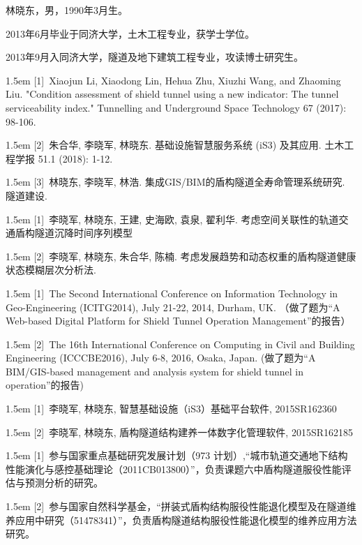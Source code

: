 \begin{resume}

	林晓东，男，1990年3月生。

	2013年6月毕业于同济大学，土木工程专业，获学士学位。

	2013年9月入同济大学，隧道及地下建筑工程专业，攻读博士研究生。


	\hangindent 1.5em
	[1]~Xiaojun Li, Xiaodong Lin, Hehua Zhu, Xiuzhi Wang, and Zhaoming Liu. "Condition assessment of shield tunnel using a new indicator: The tunnel serviceability index." Tunnelling and Underground Space Technology 67 (2017): 98-106.

	\hangindent 1.5em
	[2]~朱合华, 李晓军, 林晓东. 基础设施智慧服务系统 (iS3) 及其应用. 土木工程学报 51.1 (2018): 1-12.

	\hangindent 1.5em
	[3]~林晓东, 李晓军, 林浩. 集成GIS/BIM的盾构隧道全寿命管理系统研究. 隧道建设.


	\hangindent 1.5em
	[1]~李晓军, 林晓东, 王建, 史海欧, 袁泉, 翟利华. 考虑空间关联性的轨道交通盾构隧道沉降时间序列模型

	\hangindent 1.5em
	[2]~李晓军, 林晓东, 朱合华, 陈楠. 考虑发展趋势和动态权重的盾构隧道健康状态模糊层次分析法.


	\hangindent 1.5em
	[1]~The Second  International  Conference  on  Information  Technology  in  Geo-Engineering (ICITG2014), July 21-22, 2014, Durham, UK. （做了题为“A Web-based Digital Platform for Shield Tunnel Operation Management”的报告）

	\hangindent 1.5em
	[2]~The 16th International Conference on Computing in Civil and Building Engineering (ICCCBE2016), July 6-8, 2016, Osaka, Japan. (做了题为“A BIM/GIS-based management and analysis system for shield tunnel in operation”的报告)


	\hangindent 1.5em
	[1]~李晓军, 林晓东, 智慧基础设施（iS3）基础平台软件, 2015SR162360

	\hangindent 1.5em
	[2]~李晓军, 林晓东, 盾构隧道结构建养一体数字化管理软件, 2015SR162185


	\hangindent 1.5em
	[1]~参与国家重点基础研究发展计划（973 计划）,“城市轨道交通地下结构性能演化与感控基础理论（2011CB013800）”，负责课题六中盾构隧道服役性能评估与预测分析的研究。

	\hangindent 1.5em
	[2]~参与国家自然科学基金，“拼装式盾构结构服役性能退化模型及在隧道维养应用中研究（51478341）”，负责盾构隧道结构服役性能退化模型的维养应用方法研究。

\end{resume}